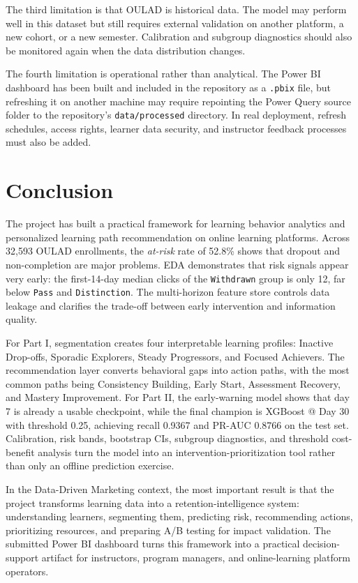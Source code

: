 \documentclass[conference]{IEEEtran}
\newcommand{\risk}{\textit{at-risk}}
\begin{document}
The third limitation is that OULAD is historical data. The model may perform well in this dataset but still requires external validation on another platform, a new cohort, or a new semester. Calibration and subgroup diagnostics should also be monitored again when the data distribution changes.

The fourth limitation is operational rather than analytical. The Power BI dashboard has been built and included in the repository as a \texttt{.pbix} file, but refreshing it on another machine may require repointing the Power Query source folder to the repository's \texttt{data/processed} directory. In real deployment, refresh schedules, access rights, learner data security, and instructor feedback processes must also be added.

\section{Conclusion}

The project has built a practical framework for learning behavior analytics and personalized learning path recommendation on online learning platforms. Across 32,593 OULAD enrollments, the \risk{} rate of 52.8\% shows that dropout and non-completion are major problems. EDA demonstrates that risk signals appear very early: the first-14-day median clicks of the \texttt{Withdrawn} group is only 12, far below \texttt{Pass} and \texttt{Distinction}. The multi-horizon feature store controls data leakage and clarifies the trade-off between early intervention and information quality.

For Part I, segmentation creates four interpretable learning profiles: Inactive Drop-offs, Sporadic Explorers, Steady Progressors, and Focused Achievers. The recommendation layer converts behavioral gaps into action paths, with the most common paths being Consistency Building, Early Start, Assessment Recovery, and Mastery Improvement. For Part II, the early-warning model shows that day 7 is already a usable checkpoint, while the final champion is XGBoost @ Day 30 with threshold 0.25, achieving recall 0.9367 and PR-AUC 0.8766 on the test set. Calibration, risk bands, bootstrap CIs, subgroup diagnostics, and threshold cost-benefit analysis turn the model into an intervention-prioritization tool rather than only an offline prediction exercise.

In the Data-Driven Marketing context, the most important result is that the project transforms learning data into a retention-intelligence system: understanding learners, segmenting them, predicting risk, recommending actions, prioritizing resources, and preparing A/B testing for impact validation. The submitted Power BI dashboard turns this framework into a practical decision-support artifact for instructors, program managers, and online-learning platform operators.
\end{document}
